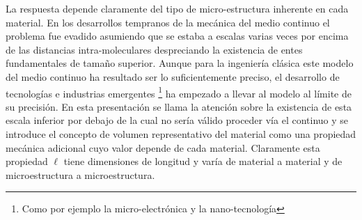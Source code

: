 \documentclass[../notas medios.tex]{subfiles}
\begin{document}
La respuesta depende claramente del tipo de micro-estructura inherente en cada material.  En los desarrollos tempranos de la mecánica del medio continuo el problema fue evadido asumiendo que se estaba a escalas varias veces por encima de las distancias intra-moleculares despreciando la existencia de entes fundamentales de tamaño superior.  Aunque para la ingeniería clásica este modelo del medio continuo ha resultado ser lo suficientemente preciso, el desarrollo de tecnologías e industrias emergentes \footnote{Como por ejemplo la micro-electrónica y la nano-tecnología} ha empezado a llevar al modelo al límite de su precisión.  En esta presentación se llama la atención sobre la existencia de esta escala inferior por debajo de la cual no sería válido proceder vía el continuo y se introduce el concepto de volumen representativo del material como una propiedad mecánica adicional cuyo valor depende de cada material.  Claramente esta propiedad $\ell$ tiene dimensiones de longitud y varía de material a material y de microestructura a microestructura.
\end{document}
